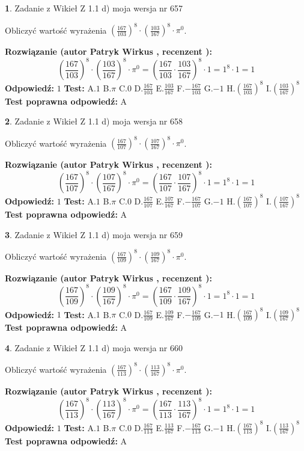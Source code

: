 \documentclass[12pt, a4paper]{article}
\theoremstyle{definition} %
\newtheorem{zad}{}
\newcommand{\zadStart}[1]{\begin{zad}#1\newline}
\newcommand{\zadStop}{\end{zad}}
\newcommand{\rozwStart}[2]{\noindent \textbf{Rozwiązanie (autor #1 , recenzent #2): }\newline}
\newcommand{\rozwStop}{\newline}
\newcommand{\odpStart}{\noindent \textbf{Odpowiedź:}\newline}
\newcommand{\odpStop}{\newline}
\newcommand{\testStart}{\noindent \textbf{Test:}\newline}
\newcommand{\testStop}{\newline}
\newcommand{\kluczStart}{\noindent \textbf{Test poprawna odpowiedź:}\newline}
\newcommand{\kluczStop}{\newline}
\begin{document}
\zadStart{Zadanie z Wikieł Z 1.1 d) moja wersja nr 657}

Obliczyć wartość wyrażenia $(\frac{167}{103})^{8} \cdot (\frac{103}{167})^{8} \cdot \pi^{0}$.
\zadStop
\rozwStart{Patryk Wirkus}{}
$$(\frac{167}{103})^{8} \cdot (\frac{103}{167})^{8} \cdot \pi^{0} = (\frac{167}{103} \cdot \frac{103}{167})^{8} \cdot 1 = 1^{8} \cdot 1 = 1$$
\rozwStop
\odpStart
$1$
\odpStop
\testStart
A.$1$ B.$\pi$ C.$0$ D.$\frac{167}{103}$ E.$\frac{103}{167}$
F.$-\frac{167}{103}$ G.$-1$
H.$(\frac{167}{103})^{8}$
I.$(\frac{103}{167})^{8}$
\testStop
\kluczStart
A
\kluczStop



\zadStart{Zadanie z Wikieł Z 1.1 d) moja wersja nr 658}

Obliczyć wartość wyrażenia $(\frac{167}{107})^{8} \cdot (\frac{107}{167})^{8} \cdot \pi^{0}$.
\zadStop
\rozwStart{Patryk Wirkus}{}
$$(\frac{167}{107})^{8} \cdot (\frac{107}{167})^{8} \cdot \pi^{0} = (\frac{167}{107} \cdot \frac{107}{167})^{8} \cdot 1 = 1^{8} \cdot 1 = 1$$
\rozwStop
\odpStart
$1$
\odpStop
\testStart
A.$1$ B.$\pi$ C.$0$ D.$\frac{167}{107}$ E.$\frac{107}{167}$
F.$-\frac{167}{107}$ G.$-1$
H.$(\frac{167}{107})^{8}$
I.$(\frac{107}{167})^{8}$
\testStop
\kluczStart
A
\kluczStop



\zadStart{Zadanie z Wikieł Z 1.1 d) moja wersja nr 659}

Obliczyć wartość wyrażenia $(\frac{167}{109})^{8} \cdot (\frac{109}{167})^{8} \cdot \pi^{0}$.
\zadStop
\rozwStart{Patryk Wirkus}{}
$$(\frac{167}{109})^{8} \cdot (\frac{109}{167})^{8} \cdot \pi^{0} = (\frac{167}{109} \cdot \frac{109}{167})^{8} \cdot 1 = 1^{8} \cdot 1 = 1$$
\rozwStop
\odpStart
$1$
\odpStop
\testStart
A.$1$ B.$\pi$ C.$0$ D.$\frac{167}{109}$ E.$\frac{109}{167}$
F.$-\frac{167}{109}$ G.$-1$
H.$(\frac{167}{109})^{8}$
I.$(\frac{109}{167})^{8}$
\testStop
\kluczStart
A
\kluczStop



\zadStart{Zadanie z Wikieł Z 1.1 d) moja wersja nr 660}

Obliczyć wartość wyrażenia $(\frac{167}{113})^{8} \cdot (\frac{113}{167})^{8} \cdot \pi^{0}$.
\zadStop
\rozwStart{Patryk Wirkus}{}
$$(\frac{167}{113})^{8} \cdot (\frac{113}{167})^{8} \cdot \pi^{0} = (\frac{167}{113} \cdot \frac{113}{167})^{8} \cdot 1 = 1^{8} \cdot 1 = 1$$
\rozwStop
\odpStart
$1$
\odpStop
\testStart
A.$1$ B.$\pi$ C.$0$ D.$\frac{167}{113}$ E.$\frac{113}{167}$
F.$-\frac{167}{113}$ G.$-1$
H.$(\frac{167}{113})^{8}$
I.$(\frac{113}{167})^{8}$
\testStop
\kluczStart
A
\kluczStop
\end{document}
